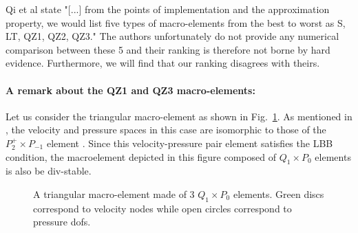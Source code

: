 \documentclass[a4paper,12pt]{article}
\begin{document}
Qi et al \cite{qizh07} state "[...] from the points of implementation and the approximation property, we 
would list five types of macro-elements from the best to worst as S, LT, QZ1, QZ2, QZ3." 
The authors unfortunately do not provide any numerical comparison between these 5 and their 
ranking is therefore not borne by hard evidence. Furthermore, we will find that our ranking disagrees with theirs. 

\paragraph{A remark about the QZ1 and QZ3 macro-elements:}
Let us consider the triangular macro-element as shown in Fig.~\ref{fig:triangle}.
As mentioned in \cite{rovira1992}, 
the velocity and pressure spaces in this case are isomorphic to those
of the $P_2^+ \times P_{-1}$ element \cite{thba25}. Since this velocity-pressure pair 
element satisfies the LBB condition, the macroelement depicted in this figure
composed of $Q_1 \times P_0$ elements is also be div-stable.

\begin{figure}
\centering
{}
\caption{A triangular macro-element made of 3 $Q_1\times P_0$ elements.
Green discs correspond to velocity nodes while open circles 
correspond to pressure dofs.}\label{fig:triangle}
\end{figure}

\vspace{.4cm}
\end{document}
